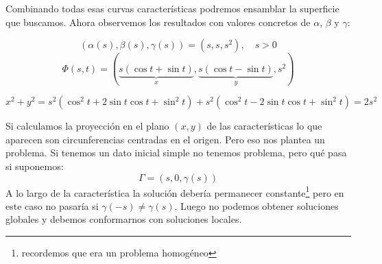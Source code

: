 \begin{example}[2]
		Combinando todas esas curvas características podremos ensamblar la superficie que buscamos. Ahora observemos los resultados con valores concretos de $\alpha$, $\beta$ y $\gamma$:

		$$(\alpha(s), \beta(s), \gamma(s)) = (s,s,s^2), \quad s>0$$
		$$\Phi(s,t) = (\underbrace{s(\cos t + \sin t)}_{x}, \underbrace{s(\cos t - \sin t)}_{y},s^2)$$

		$$x^2 + y^2 = s^2 (\cos^2 t + 2 \sin t \cos t + \sin^2 t) + s^2 (\cos^2 t - 2 \sin t \cos t + \sin^2 t) = 2s^2$$

		Si calculamos la proyección en el plano $(x,y)$ de las características lo que aparecen son circunferencias centradas en el origen. Pero eso nos plantea un problema. Si tenemos un dato inicial simple no tenemos problema, pero qué pasa si suponemos:
		$$\Gamma = (s, 0, \gamma(s))$$
		A lo largo de la característica la solución debería permanecer constante\footnote{recordemos que era un problema homogéneo
		} pero en este caso no pasaría si $\gamma(-s) \neq \gamma(s)$. Luego no podemos obtener soluciones globales y debemos conformarnos con soluciones locales.


	\end{example}

